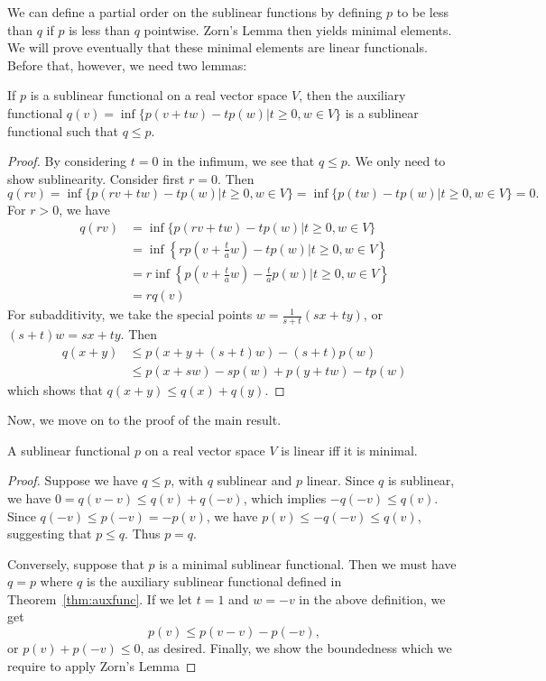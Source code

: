 \documentclass[prb,12pt]{revtex4-2}
\theoremstyle{definition}
\theoremstyle{definition}
\theoremstyle{definition}
\begin{document}
We can define a partial order on the sublinear functions by defining $p$ to be less than $q$ if $p$ is less than $q$ pointwise. Zorn's Lemma then yields minimal elements. We will prove eventually that these minimal elements are linear functionals. Before that, however, we need two lemmas:

\begin{Theorem}\label{thm:auxfunc}
	If $p$ is a sublinear functional on a real vector space $V$, then the auxiliary functional $q(v)=\inf \{p(v+tw)-tp(w)|t\ge 0,w\in V\} $ is a sublinear functional such that $q \le p$.
\end{Theorem}
\begin{proof}
	By considering $t=0$ in the infimum, we see that $q\le p$. We only need to show sublinearity. Consider first $r=0$. Then
	\[
	q(rv)=\inf \{p(rv+tw)-tp(w)|t\ge 0,w\in V\} =\inf \{p(tw)-tp(w)|t\ge 0, w\in V\} =0
	.\] 
	For $r>0$, we have
	\begin{align*}
		q(rv)&=\inf \{p(rv+tw)-tp(w)|t \ge 0, w\in V\} \\
		     &=\inf \left\{ rp\left( v+\frac{t}{a}w \right)-tp(w)|t\ge 0, w\in V \right\} \\
		     &=r\inf \left\{p\left(v+\frac ta w\right) -\frac ta p(w)|t\ge 0, w\in V\right\} \\
		     &=rq(v)
	\end{align*}
	For subadditivity, we take the special points $w=\frac{1}{s+t}(sx+ty)$, or $(s+t)w=sx+ty$. Then
	\begin{align*}
		q(x+y)&\le p(x+y+(s+t)w)-(s+t)p(w)\\
		      &\le p(x+sw)-sp(w)+p(y+tw)-tp(w)
	\end{align*}
	which shows that $q(x+y)\le q(x)+q(y)$.
\end{proof}
Now, we move on to the proof of the main result.
\begin{Theorem}
	A sublinear functional $p$ on a real vector space $V$ is linear iff it is minimal.
\end{Theorem}
\begin{proof}
	Suppose we have $q\le p$, with $q$ sublinear and $p$ linear. Since $q$ is sublinear, we have $0=q(v-v)\le q(v)+q(-v)$, which implies $-q(-v)\le q(v)$. Since $q(-v) \le p(-v)=-p(v)$, we have $p(v)\le -q(-v)\le q(v)$, suggesting that $p\le q$. Thus $p=q$.

	Conversely, suppose that $p$ is a minimal sublinear functional. Then we must have $q=p$ where $q$ is the auxiliary sublinear functional defined in Theorem~\ref{thm:auxfunc}. If we let $t=1$ and $w=-v$ in the above definition, we get
	\[
	p(v)\le p(v-v)-p(-v)
,\]
or $p(v)+p(-v)\le 0$, as desired. Finally, we show the boundedness which we require to apply Zorn's Lemma
\end{proof}
\end{document}
